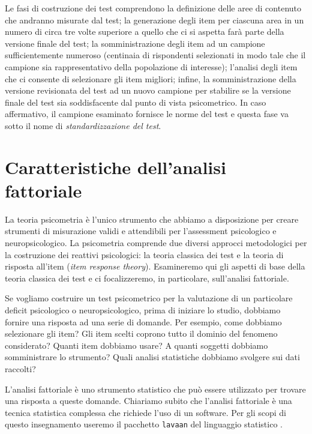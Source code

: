 Le fasi di costruzione dei test comprendono la definizione delle aree di contenuto che andranno misurate dal test; la generazione degli item per ciascuna area in un numero di circa tre volte superiore a quello che ci si aspetta farà parte della versione finale del test; la somministrazione degli item ad un campione sufficientemente numeroso (centinaia di rispondenti selezionati in modo tale che il campione sia rappresentativo della popolazione di interesse); l’analisi degli item che ci consente di selezionare gli item migliori; infine, la somministrazione della versione revisionata del test ad un nuovo campione per stabilire se la versione finale del test sia soddisfacente dal punto di vista psicometrico. In caso affermativo, il campione esaminato fornisce le norme del test e questa fase va sotto il nome di \emph{standardizzazione del test}.


\section{Caratteristiche dell'analisi fattoriale}

La teoria psicometria è l'unico strumento che abbiamo a disposizione per creare strumenti di misurazione validi e attendibili per l'assessment psicologico e neuropsicologico. 
La psicometria comprende due diversi approcci metodologici per la costruzione dei reattivi psicologici: la teoria classica dei test e la teoria di risposta all'item (\emph{item response theory}). Esamineremo qui gli aspetti di base della teoria classica dei test e ci focalizzeremo, in particolare, sull'analisi fattoriale.

Se vogliamo costruire un test psicometrico per la valutazione di un particolare deficit psicologico o neuropsicologico, prima di iniziare lo studio, dobbiamo fornire una risposta ad una serie di domande. Per esempio, come dobbiamo selezionare gli item? Gli item scelti coprono tutto il dominio del fenomeno considerato? Quanti item dobbiamo usare? A quanti soggetti dobbiamo somministrare lo strumento? Quali analisi statistiche dobbiamo svolgere sui dati raccolti? 

L'analisi fattoriale è uno strumento statistico che può essere utilizzato per trovare una  risposta a queste domande. Chiariamo subito che l'analisi fattoriale è una tecnica statistica complessa che richiede l'uso di un software. Per gli scopi di questo insegnamento useremo il pacchetto \texttt{lavaan} del linguaggio statistico \R.

